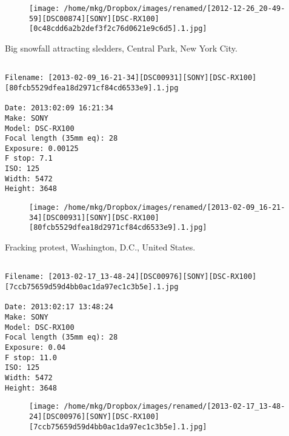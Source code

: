 \begin{figure}
\texttt{[image: /home/mkg/Dropbox/images/renamed/[2012-12-26\_20-49-59][DSC00874][SONY][DSC-RX100][0c48cdd6a2b2def3f2c76d0621e9c6d5].1.jpg]}
\end{figure}
    
\clearpage
\onecolumn
\noindent Big snowfall attracting sledders, Central Park, New York City.
\noindent
\begin{lstlisting}

Filename: [2013-02-09_16-21-34][DSC00931][SONY][DSC-RX100][80fcb5529dfea18d2971cf84cd6533e9].1.jpg

Date: 2013:02:09 16:21:34
Make: SONY
Model: DSC-RX100
Focal length (35mm eq): 28
Exposure: 0.00125
F stop: 7.1
ISO: 125
Width: 5472
Height: 3648
\end{lstlisting}
\clearpage

\begin{figure}
\texttt{[image: /home/mkg/Dropbox/images/renamed/[2013-02-09\_16-21-34][DSC00931][SONY][DSC-RX100][80fcb5529dfea18d2971cf84cd6533e9].1.jpg]}
\end{figure}
    
\clearpage
\onecolumn
\noindent Fracking protest, Washington, D.C., United States.
\noindent
\begin{lstlisting}

Filename: [2013-02-17_13-48-24][DSC00976][SONY][DSC-RX100][7ccb75659d59d4bb0ac1da97ec1c3b5e].1.jpg

Date: 2013:02:17 13:48:24
Make: SONY
Model: DSC-RX100
Focal length (35mm eq): 28
Exposure: 0.04
F stop: 11.0
ISO: 125
Width: 5472
Height: 3648
\end{lstlisting}
\clearpage

\begin{figure}
\texttt{[image: /home/mkg/Dropbox/images/renamed/[2013-02-17\_13-48-24][DSC00976][SONY][DSC-RX100][7ccb75659d59d4bb0ac1da97ec1c3b5e].1.jpg]}
\end{figure}
    
